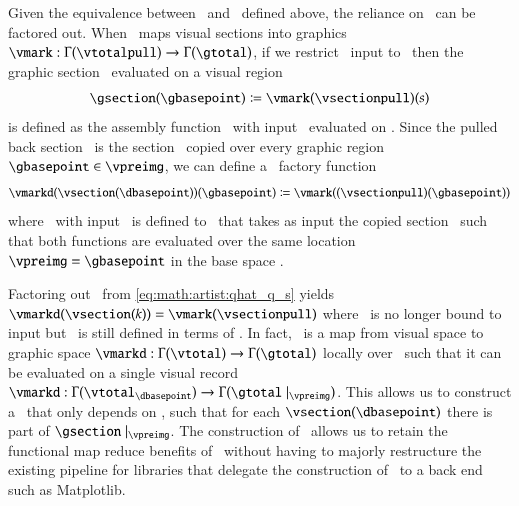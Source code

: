 \documentclass[journal]{vgtc}                %
\begin{document}
Given the equivalence between \vsection\ and \vsectionpull\ defined above, the reliance on \gbase\ can be factored out. When \vmark\ maps visual sections into graphics $\vmark: \Gamma(\vtotalpull) \rightarrow \Gamma(\gtotal)$, if we restrict \vmark\ input to \vsectionpull\ then the graphic section \gsection\ evaluated on a visual region \gbasepoint\
\begin{equation}
    \gsection(\gbasepoint) \coloneqq \vmark(\vsectionpull)(s)
    \label{eq:math:artist:qhat}
\end{equation}
 is defined as the assembly function \vmark\ with input \vsectionpull\ evaluated on \gbasepoint. Since the pulled back section \vsectionpull\ is the section \vsection\ copied over every graphic region $\gbasepoint \in \vpreimg$, we can define a \vmark\ factory function 
\begin{equation}
\label{eq:math:artist:qhat_q_s}
\vmarkd(\vsection(\dbasepoint))(\gbasepoint) \coloneqq \vmark((\vsectionpull)(\gbasepoint))
\end{equation} 
where \vmarkd\ with input \vsection\ is defined to \vmark\ that takes as input the copied section \vsectionpull\ such that both functions are evaluated over the same location $\vpreimg = \gbasepoint$ in the base space \gbase. 

Factoring out \gbasepoint\ from \autoref{eq:math:artist:qhat_q_s} yields $\vmarkd(\vsection(k)) = \vmark(\vsectionpull)$ where \vmark\ is no longer bound to input but \vmarkd\ is still defined in terms of \dbase. In fact, \vmarkd\ is a map from visual space to graphic space $\vmarkd:\Gamma(\vtotal) \rightarrow \Gamma(\gtotal)$ locally over \dbasepoint\ such that it can be evaluated on a single visual record  $\vmarkd:\Gamma(\vtotal_{\dbasepoint}) \rightarrow \Gamma(\gtotal\mid_{\vpreimg})$. This allows us to construct a \vmarkd\ that only depends on \dbase, such that for each $\vsection(\dbasepoint)$ there is part of $\gsection\mid_{\vpreimg}$. The construction of \vmarkd\ allows us to retain the functional map reduce benefits of \vmark\ without having to majorly restructure the existing pipeline for libraries that delegate the construction of \gsection\ to a back end such as Matplotlib.
\end{document}
